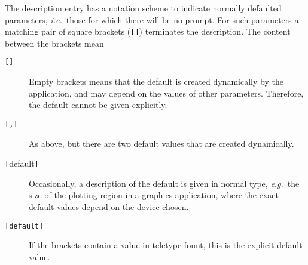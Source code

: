 \documentclass[twoside,11pt]{article}
\begin{document}
The description entry has a notation scheme to indicate 
normally defaulted parameters, {\it{i.e.}}\ those for which there will
be no prompt.
For such parameters a matching pair of square brackets ({\tt{[]}})
terminates the description.  The content between the brackets mean
\begin{description}
\item[{\tt{[]}}]
Empty brackets means that the default is created dynamically
by the application, and may depend on the values of other parameters.
Therefore, the default cannot be given explicitly.
\item[{\tt [,]}]
As above, but there are two default values that are created dynamically.
\item[{\tt [}{\rm default}{\tt{]}}]
Occasionally, a description of the default is given in normal type,
{\it{e.g.}}\ the size of the plotting region in a graphics application,
where the exact default values depend on the device chosen. 
\item[{\tt [default]}]
If the brackets contain a value in teletype-fount, this is the explicit
default value.
\end{description}
\end{document}
